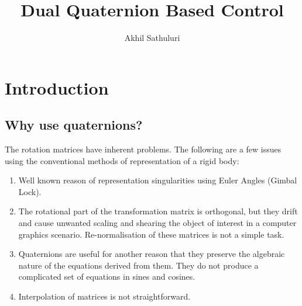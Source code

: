 \documentclass[a4paper,12pt]{article}
\date{}
\title{Dual Quaternion Based Control}
\author{Akhil Sathuluri}
\begin{document}
%
\maketitle %
\section{Introduction}

\subsection{Why use quaternions?}
The rotation matrices have inherent problems. The following are a few issues using the conventional methods of representation of a rigid body:
\begin{enumerate}
	\item Well known reason of representation singularities using Euler Angles (Gimbal Lock).
	\item The rotational part of the transformation matrix is orthogonal, but they drift and cause unwanted scaling and shearing the object of interest in a computer graphics scenario\cite{ken2012beginners}. Re-normalisation of these matrices is not a simple task. 
	\item Quaternions are useful for another reason that they preserve the algebraic nature of the equations derived from them. They do not produce a complicated set of equations in sines and cosines.
	\item Interpolation of matrices is not straightforward.
\end{enumerate}
\end{document}
